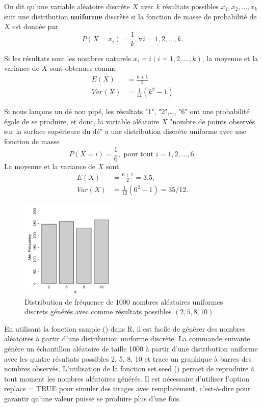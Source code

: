 {\theoremstyle{definition}
\begin{definition}
    On dit qu'une variable aléatoire discrète $ X $ avec $ k $ résultats possibles $ x_1, x_2, ..., x_k $ suit une
    distribution \textbf{uniforme} discrète si la fonction de masse de probabilité de $X$ est donnée par
    \begin{equation}
        P(X=x_i)=\frac{1}{k}, \forall i=1, 2,\dots,k.
    \end{equation}
\end{definition}
Si les résultats sont les nombres naturels $ x_i = i (i = 1,2, ..., k) $, la moyenne et la variance de $ X $ sont
obtenues comme
\begin{align}
    E(X) &= \frac{k+1}{2}\\
    Var(X) &=\frac{1}{12}(k^2-1)
\end{align}

\begin{example}
    Si nous lançons un dé non pipé, les résultats "1", "2",\dots, "6" ont une probabilité égale de se produire, et donc,
    la variable aléatoire $X$ "nombre de points observés sur la surface supérieure du dé" a une distribution discrète
    uniforme avec une fonction de masse
    $$P(X=i)=\frac{1}{6}, \text{ pour tout } i=1,2,\dots,6.$$
    La moyenne et la variance de $X$ sont
    \begin{align*}
        E(X) &=\frac{6+1}{2}=3.5,\\
        Var(X) &=\frac{1}{12}(6^2-1)=35/12.
    \end{align*}
    \begin{figure}
        \caption{Distribution de fréquence de $1000 $ nombres aléatoires uniformes
discrets générés avec comme résultats possibles $ (2,5,8,10) $}
        \label{fig:frecunif}
        \includegraphics[width=0.4\textwidth]{content/frecunif.PNG}
    \end{figure}
\end{example}
En utilisant la fonction sample () dans R, il est facile de générer des nombres aléatoires à partir d'une distribution
uniforme discrète. La commande suivante génère un échantillon aléatoire de taille 1000 à partir d'une distribution
uniforme avec les quatre résultats possibles 2, 5, 8, 10 et trace un graphique à barres des nombres observés.
L'utilisation de la fonction set.seed () permet de reproduire à tout moment les nombres aléatoires générés. Il est
nécessaire d'utiliser l'option replace = TRUE pour simuler des tirages avec remplacement, c'est-à-dire pour garantir
qu'une valeur puisse se produire plus d'une fois.

}
